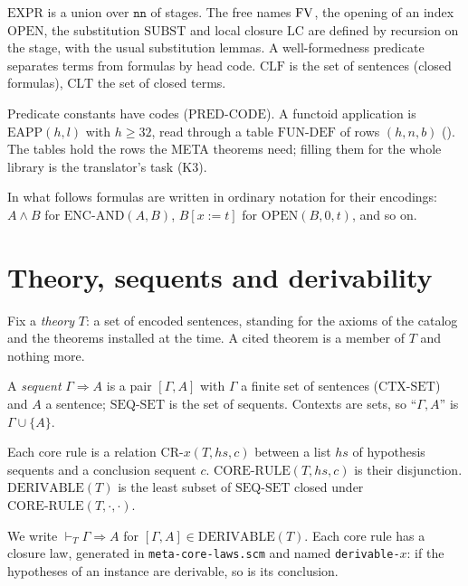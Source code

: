 $\mathrm{EXPR}$ is a union over $\mathtt{nn}$ of stages.  The free
names $\mathrm{FV}$, the opening of an index $\mathrm{OPEN}$, the substitution
$\mathrm{SUBST}$ and local closure $\mathrm{LC}$ are defined by
recursion on the stage, with the usual substitution lemmas.  A
well-formedness predicate separates terms from formulas by head code.
$\mathrm{CLF}$ is the set of sentences (closed formulas), $\mathrm{CLT}$
the set of closed terms.

Predicate constants have codes ($\mathrm{PRED\text{-}CODE}$).  A
functoid application is $\mathrm{EAPP}(h,l)$ with $h\geq 32$, read
through a table $\mathrm{FUN\text{-}DEF}$ of rows $(h, n, b)$
().  The tables hold the rows the META theorems need; filling
them for the whole library is the translator's task (K3).

In what follows formulas are written in ordinary notation for their
encodings: $A \wedge B$ for $\mathrm{ENC\text{-}AND}(A,B)$, $B[x:=t]$ for
$\mathrm{OPEN}(B,0,t)$, and so on.

\section{Theory, sequents and derivability}\label{sec:meta-derivable}

Fix a \emph{theory} $T$: a set of encoded sentences, standing for the
axioms of the catalog and the theorems installed at the time.  A cited
theorem is a member of $T$ and nothing more.

A \emph{sequent} $\Gamma \Longrightarrow A$ is a pair $[\Gamma, A]$ with
$\Gamma$ a finite set of sentences ($\mathrm{CTX\text{-}SET}$) and $A$ a
sentence; $\mathrm{SEQ\text{-}SET}$ is the set of sequents.  Contexts are
sets, so ``$\Gamma, A$'' is $\Gamma \cup \{A\}$.

Each core rule is a relation $\mathrm{CR\text{-}}x(T, \mathit{hs}, c)$
between a list $\mathit{hs}$ of hypothesis sequents and a conclusion
sequent $c$.  $\mathrm{CORE\text{-}RULE}(T, \mathit{hs}, c)$ is their
disjunction.  $\mathrm{DERIVABLE}(T)$ is the least subset of
$\mathrm{SEQ\text{-}SET}$ closed under
$\mathrm{CORE\text{-}RULE}(T,\cdot,\cdot)$.

We write $\vdash_T \Gamma \Longrightarrow A$ for
$[\Gamma, A] \in \mathrm{DERIVABLE}(T)$.  Each core rule has a closure
law, generated in \texttt{meta-core-laws.scm} and named
\texttt{derivable-}$x$: if the hypotheses of an instance are derivable,
so is its conclusion.

